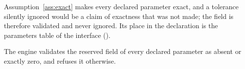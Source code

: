 
Assumption~\ref{ass:exact} makes every declared parameter exact, and a
tolerance silently ignored would be a claim of exactness that was not made;
the field is therefore validated and never ignored. Its place in the
declaration is the parameters table of the interface
().

\begin{requirement}\label{req:reserved-tolerance-field}
The engine validates the reserved  field of every declared
parameter as absent or exactly zero, and refuses it otherwise.
\end{requirement}
